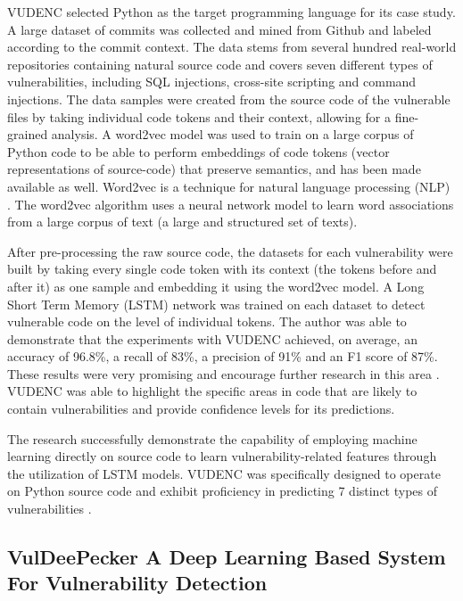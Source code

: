 VUDENC selected Python as the target programming language for its case study. A large dataset of commits was collected and mined from Github and labeled according to the commit context. The data stems from several hundred real-world repositories containing natural source code and covers seven different types of vulnerabilities, including SQL injections, cross-site scripting and command injections. The data samples were created from the source code of the vulnerable files by taking individual code tokens and their context, allowing for a fine-grained analysis. A word2vec model was used to train on a large corpus of Python code to be able to perform embeddings of code tokens (vector representations of source-code) that preserve semantics, and has been made available as well. Word2vec \cite{Word2vec} is a technique for natural language processing (NLP) \cite{NLP_WIKIPEDIA}. The word2vec algorithm uses a neural network model to learn word associations from a large corpus of text (a large and structured set of texts). 


After pre-processing the raw source code, the datasets for each vulnerability were built by taking every single code token with its context (the tokens before and after it) as one sample and embedding it using the word2vec model. A Long Short Term Memory (LSTM) network was trained on each dataset to detect vulnerable code on the level of individual tokens. The author was able to demonstrate that the experiments with VUDENC achieved, on average, an accuracy of 96.8\%, a recall of 83\%, a precision of 91\% and an F1 score of 87\%. These results were very promising and encourage further research in this area \cite{Wartschinski2019}. VUDENC was able to highlight the specific areas in code that are likely to contain vulnerabilities and provide confidence levels for its predictions.


The research successfully demonstrate the capability of employing machine learning directly on source code to learn vulnerability-related features through the utilization of LSTM models. VUDENC was specifically designed to operate on Python source code and exhibit proficiency in predicting 7 distinct types of vulnerabilities \cite{Wartschinski2019}.


\subsection{VulDeePecker A Deep Learning Based System For Vulnerability Detection} %
\label{sec:	VulDeePecker_A_Deep_Learning_Based_System_For_Vulnerability_Detection}

